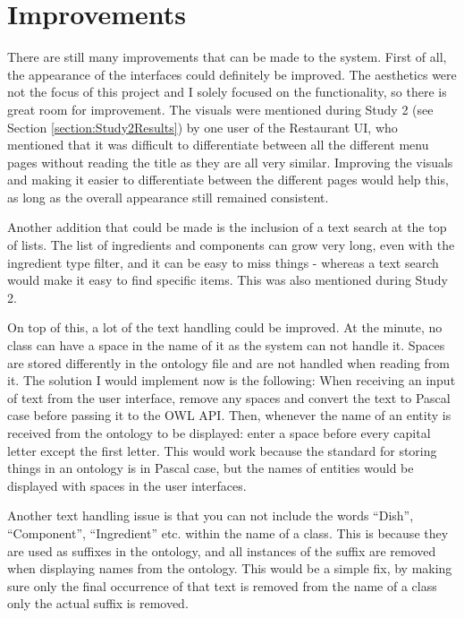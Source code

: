 \section{Improvements}

There are still many improvements that can be made to the system. First of all, the appearance of the interfaces could definitely be improved. The aesthetics were not the focus of this project and I solely focused on the functionality, so there is great room for improvement. The visuals were mentioned during Study 2 (see Section \ref{section:Study2Results}) by one user of the Restaurant UI, who mentioned that it was difficult to differentiate between all the different menu pages without reading the title as they are all very similar. Improving the visuals and making it easier to differentiate between the different pages would help this, as long as the overall appearance still remained consistent.

Another addition that could be made is the inclusion of a text search at the top of lists. The list of ingredients and components can grow very long, even with the ingredient type filter, and it can be easy to miss things - whereas a text search would make it easy to find specific items. This was also mentioned during Study 2.

On top of this, a lot of the text handling could be improved. At the minute, no class can have a space in the name of it as the system can not handle it. Spaces are stored differently in the ontology file and are not handled when reading from it. The solution I would implement now is the following: When receiving an input of text from the user interface, remove any spaces and convert the text to Pascal case before passing it to the OWL API. Then, whenever the name of an entity is received from the ontology to be displayed: enter a space before every capital letter except the first letter. This would work because the standard for storing things in an ontology is in Pascal case, but the names of entities would be displayed with spaces in the user interfaces.

Another text handling issue is that you can not include the words ``Dish'', ``Component'', ``Ingredient'' etc. within the name of a class. This is because they are used as suffixes in the ontology, and all instances of the suffix are removed when displaying names from the ontology. This would be a simple fix, by making sure only the final occurrence of that text is removed from the name of a class only the actual suffix is removed.

